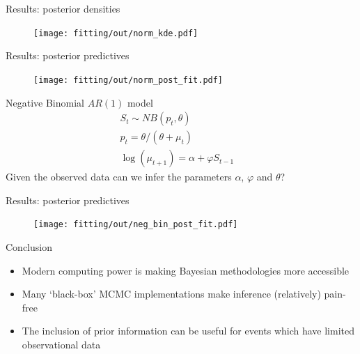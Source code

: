 \documentclass[aspectratio=169]{beamer}
\begin{document}
\begin{frame}{Results: posterior densities}
  \begin{figure}
    \centering
    \texttt{[image: fitting/out/norm\_kde.pdf]}
  \end{figure}
\end{frame}

\begin{frame}{Results: posterior predictives}
  \vspace{-0.3cm}
  \begin{figure}
    \centering
    \texttt{[image: fitting/out/norm\_post\_fit.pdf]}
  \end{figure}
\end{frame}

\begin{frame}{Negative Binomial $AR(1)$ model}
  \begin{align*}
      S_{t} \sim NB(p_{t}, \theta)            & \\
      p_{t} = \theta / (\theta + \mu_{t})     & \\
      \log(\mu_{t+1}) = \alpha + \varphi S_{t-1} &
  \end{align*}
  Given the observed data can we infer the parameters $\alpha$,
  $\varphi$ and $\theta$?
\end{frame}

\begin{frame}{Results: posterior predictives}
  \vspace{-0.3cm}
  \begin{figure}
    \centering
    \texttt{[image: fitting/out/neg\_bin\_post\_fit.pdf]}
  \end{figure}
\end{frame}

\begin{frame}{Conclusion}
  \begin{itemize}
    \item Modern computing power is making Bayesian methodologies more accessible
    \item Many `black-box' MCMC implementations make inference (relatively) pain-free
    \item The inclusion of prior information can be useful for 
          events which have limited observational data
  \end{itemize}
\end{frame}
\end{document}
